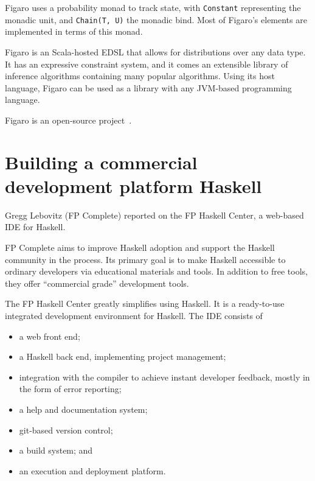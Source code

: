 \documentclass{jfp1}
\begin{document}
Figaro uses a probability monad to track state, with \texttt{Constant}
representing the monadic unit, and \texttt{Chain(T, U)} the monadic
bind. Most of Figaro's elements are implemented in terms of this monad.

Figaro is an Scala-hosted EDSL that allows for distributions over any data
type. It has an expressive constraint system, and it comes an extensible
library of inference algorithms containing many popular algorithms. Using
its host language, Figaro can be used as a library with any JVM-based
programming language.  

Figaro is an open-source project~\cite{CRA:2014:Figaro}.

\section{Building a commercial development platform Haskell}


Gregg Lebovitz (FP Complete) reported on the FP Haskell Center, 
a web-based IDE for Haskell.  

FP Complete aims to improve Haskell adoption and support the Haskell
community in the process. Its primary goal is to make Haskell accessible
to ordinary developers via educational materials and tools. In addition to
free tools, they offer ``commercial grade'' development tools.

The FP Haskell Center greatly simplifies using Haskell. It is a
ready-to-use integrated development environment for Haskell. The IDE
consists of 

\begin{itemize}

\item a web front end;

\item a Haskell back end, implementing project management;

\item integration with the compiler to achieve instant developer feedback,
mostly in the form of error reporting;

\item a help and documentation system;

\item git-based version control;

\item a build system; and

\item an execution and deployment platform.
\end{itemize}
\end{document}
